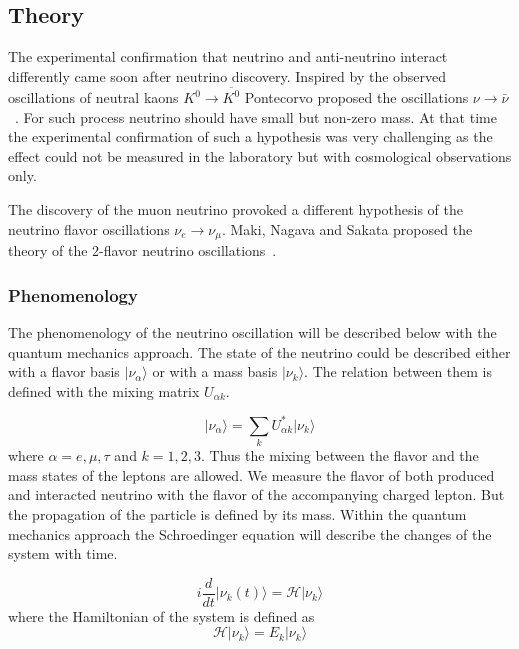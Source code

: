 \documentclass[../main.tex]{subfiles}
\begin{document}
\subsection{Theory}
The experimental confirmation that neutrino and anti-neutrino interact differently came soon after neutrino discovery. Inspired by the observed oscillations of neutral kaons $K^0\to\overline{K^0}$ Pontecorvo proposed the oscillations $\nu\to\bar\nu$~\cite{Pontecorvo1957}. For such process neutrino should have small but non-zero mass. At that time the experimental confirmation of such a hypothesis was very challenging as the effect could not be measured in the laboratory but with cosmological observations only.

The discovery of the muon neutrino provoked a different hypothesis of the neutrino flavor oscillations $\nu_e\to\nu_\mu$. Maki, Nagava and Sakata proposed the theory of the 2-flavor neutrino oscillations~\cite{Maki1962}.

\subsubsection{Phenomenology}
The phenomenology of the neutrino oscillation will be described below with the quantum mechanics approach. The state of the neutrino could be described either with a flavor basis $\lvert\nu_\alpha\rangle$ or with a mass basis $\lvert\nu_k\rangle$. The relation between them is defined with the mixing matrix $U_{\alpha k}$.

\begin{equation}
\label{eq:intro:mixing}
\lvert\nu_\alpha\rangle = \sum_kU^*_{\alpha k}\lvert\nu_k\rangle
\end{equation}
where $\alpha = e, \mu, \tau$ and $k=1, 2, 3$. Thus the mixing between the flavor and the mass states of the leptons are allowed. We measure the flavor of both produced and interacted neutrino with the flavor of the accompanying charged lepton. But the propagation of the particle is defined by its mass. Within the quantum mechanics approach the Schroedinger equation will describe the changes of the system with time.

\begin{equation}
i\frac{d}{dt}\lvert\nu_k(t)\rangle=\mathcal{H}\lvert\nu_k\rangle
\end{equation}
where the Hamiltonian of the system is defined as
\begin{equation}
\label{eq:intro:ham}
\mathcal{H}\lvert\nu_k\rangle=E_k\lvert\nu_k\rangle
\end{equation}
\end{document}
